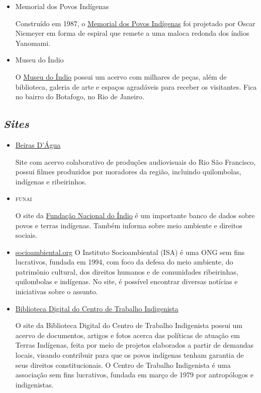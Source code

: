 \documentclass[12pt]{extarticle}
\begin{document}
\begin{itemize}

\item Memorial dos Povos Indígenas

Construído em 1987, o \href{http://www.cultura.df.gov.br/memorial-dos-povos-indigenas/}{Memorial dos Povos Indígenas} foi projetado por Oscar Niemeyer em forma de espiral que remete a uma maloca redonda dos índios Yanomami. 

\item Museu do Índio

O \href{http://www.museudoindio.gov.br}{Museu do Índio} possui um acervo com 
milhares de peças, além de biblioteca, galeria de arte e espaços agradáveis para 
receber os visitantes. Fica no bairro do Botafogo, no Rio de Janeiro.

\end{itemize}

\subsection{\emph{Sites}}

\begin{itemize}

\item \href{https://beirasdagua.org.br/}{Beiras D'Água}

Site com acervo colaborativo de produções audiovisuais do Rio São Francisco, possui filmes produzidos por
moradores da região, incluindo quilombolas, indígenas e ribeirinhos. 

\item \textsc{funai}

O site da \href{https://www.gov.br/funai}{Fundação Nacional do Índio} é um importante banco de dados
sobre povos e terras indígenas. Também informa sobre meio ambiente e
direitos sociais.

\item \href{https://www.socioambiental.org/pt-br}{socioambiental.org}
O Instituto Socioambiental (ISA) é uma ONG sem fins lucrativos, fundada em 1994, com foco da defesa do meio ambiente, do patrimônio cultural, dos direitos humanos e de comunidades ribeirinhas, quilombolas e indígenas.
No site, é possível encontrar diversas notícias e iniciativas sobre o assunto.

\item \href{https://trabalhoindigenista.org.br/}{Biblioteca Digital do Centro de Trabalho Indigenista}

O site da Biblioteca Digital do Centro de Trabalho Indigenista possui um acervo de documentos, artigos e fotos acerca das políticas de atuação em Terras Indígenas, feita por meio de projetos elaborados a partir de demandas locais, visando contribuir para que os povos indígenas tenham garantia de seus direitos constitucionais. O Centro de Trabalho Indigenista é uma associação sem fins lucrativos, fundada em março de 1979 por antropólogos e indigenistas.


\end{itemize}
\end{document}
